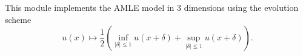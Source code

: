 This module implements the AMLE model in 3 dimensions using the evolution
scheme
$$u(x) \mapsto \frac12 \left( \inf_{|\delta|\leq 1} u(x+\delta)  
+ \sup_{|\delta|\leq 1} u(x+\delta)  \right).$$

